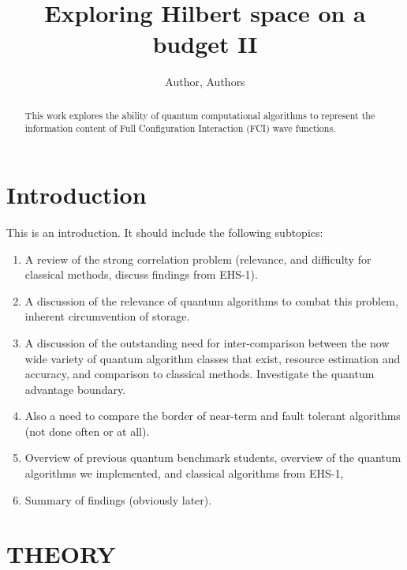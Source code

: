 \documentclass[aip,jcp,amsmath,amssymb, reprint]{revtex4-1}
\begin{document}
\title{Exploring Hilbert space on a budget II}
\author{Author, Authors}

\begin{abstract}
This work explores the ability of quantum computational algorithms to represent the information content of Full Configuration Interaction (FCI) wave functions.

\end{abstract}

\linenumbersep=24pt

\maketitle

\section{\label{sec:intro}Introduction}

This is an introduction. It should include the following subtopics:

\begin{enumerate}
\item A review of the strong correlation problem (relevance, and difficulty for classical methods, discuss findings from EHS-1).
\item A discussion of the relevance of quantum algorithms to combat this problem, inherent circumvention of storage.
\item A discussion of the outstanding need for inter-comparison between the now wide variety of quantum algorithm classes that exist, resource estimation and accuracy, and comparison to classical methods. Investigate the quantum advantage boundary.
\item Also a need to compare the border of near-term and fault tolerant algorithms (not done often or at all).
\item Overview of previous quantum benchmark students, overview of the quantum algorithms we implemented, and classical algorithms from EHS-1,
\item Summary of findings (obviously later).
\end{enumerate}

\section{THEORY}
\label{sec:theory}
\end{document}
